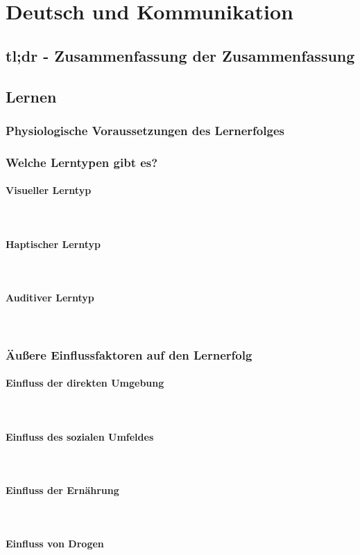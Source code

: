 \section{Deutsch und Kommunikation}

\subsection{tl;dr - Zusammenfassung der Zusammenfassung}

\subsection{Lernen}

\subsubsection{Physiologische Voraussetzungen des Lernerfolges}

\subsubsection{Welche Lerntypen gibt es?}

\paragraph{Visueller Lerntyp}~\\
\paragraph{Haptischer Lerntyp}~\\
\paragraph{Auditiver Lerntyp}~\\

\subsubsection{Äußere Einflussfaktoren auf den Lernerfolg}
\paragraph{Einfluss der direkten Umgebung}~\\
\paragraph{Einfluss des sozialen Umfeldes}~\\
\paragraph{Einfluss der Ernährung}~\\
\paragraph{Einfluss von Drogen}~\\
